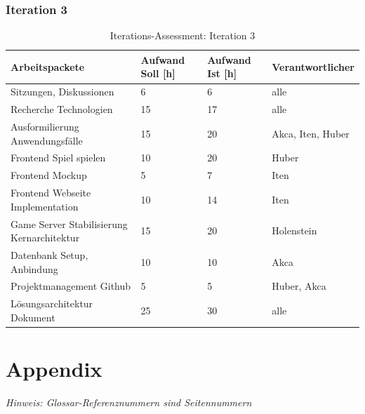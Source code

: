 \documentclass[11pt,ngerman]{article}
\begin{document}
    \subsubsection{Iteration 3}
    \begin{table}[H]
        \caption{Iterations-Assessment: Iteration 3}
        \begin{tabularx}{\textwidth}{l l l l}
            \toprule
            Arbeitspackete & Aufwand Soll [h] & Aufwand Ist [h] & Verantwortlicher \\
            \toprule
            Sitzungen, Diskussionen & 6 & 6 & alle \\
            Recherche Technologien & 15 & 17 & alle \\
            Ausformilierung Anwendungsfälle & 15 & 20 & Akca, Iten, Huber \\
            Frontend Spiel spielen & 10 & 20 & Huber \\
            Frontend Mockup & 5 & 7 & Iten \\
            Frontend Webseite Implementation & 10 & 14 & Iten \\
            Game Server Stabilisierung Kernarchitektur & 15 & 20 & Holenstein \\
            Datenbank Setup, Anbindung & 10 & 10 & Akca \\
            Projektmanagement Github & 5 & 5 & Huber, Akca \\
            Lösungsarchitektur Dokument & 25 & 30 & alle \\
            \bottomrule
        \end{tabularx}
        \label{tab:Iterations-Assessment: Iteration 3}
    \end{table}
     \newpage

    \section{Appendix}
    \textit{Hinweis: Glossar-Referenznummern sind Seitennummern}
    \printglossary
\end{document}
